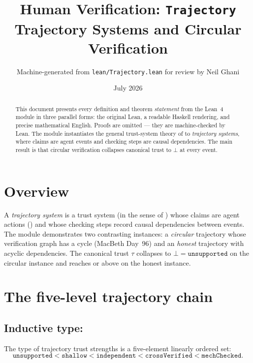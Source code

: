 \documentclass[11pt,a4paper]{article}
\title{Human Verification: \texttt{Trajectory}\\[4pt]
  \large Trajectory Systems and Circular Verification}
\author{Machine-generated from \texttt{lean/Trajectory.lean} for review by Neil Ghani}
\date{July 2026}
\begin{document}
\maketitle

\begin{abstract}
This document presents every definition and theorem \emph{statement} from the
Lean~4 module  in three parallel forms: the original Lean,
a readable Haskell rendering, and precise mathematical English.  Proofs are
omitted --- they are machine-checked by Lean.  The module instantiates the
general trust-system theory of  to \emph{trajectory systems},
where claims are agent events and checking steps are causal dependencies.
The main result is that circular verification collapses canonical trust to
$\bot$ at every event.
\end{abstract}

\tableofcontents
\bigskip

\section{Overview}

A \emph{trajectory system} is a trust system (in the sense of
) whose claims are agent actions () and whose
checking steps record causal dependencies between events.  The module
demonstrates two contrasting instances: a \emph{circular} trajectory whose
verification graph has a cycle (MacBeth Day~96) and an \emph{honest} trajectory
with acyclic dependencies.  The canonical trust $\tau$ collapses to
$\bot = \mathtt{unsupported}$ on the circular instance and reaches
 or above on the honest instance.

\section{The five-level trajectory chain}

\subsection{Inductive type: }

\begin{defn}
The type of trajectory trust strengths is a five-element linearly ordered set:
\[
  \mathtt{unsupported} < \mathtt{shallow} < \mathtt{independent}
  < \mathtt{crossVerified} < \mathtt{mechChecked}.
\]
\end{defn}
\end{document}
